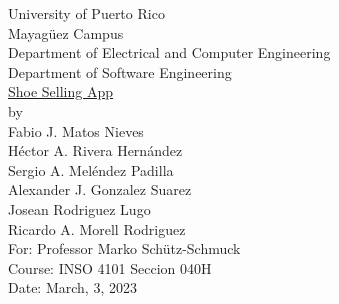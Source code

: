 \begin{titlepage}
  \begin{center}
    \large{University of Puerto Rico\\
    Mayagüez Campus\\
    \vspace{\baselineskip}
    Department of Electrical and Computer Engineering\\
    Department of Software Engineering\\}
    \vspace{5cm}
    \Huge{\underline{Shoe Selling App}\\}
    \vspace{3cm}
    \large by\\
    Fabio J. Matos Nieves\\
    Héctor A. Rivera Hernández\\
    Sergio A. Meléndez Padilla\\
    Alexander J. Gonzalez Suarez\\
    Josean Rodriguez Lugo\\
    Ricardo A. Morell Rodriguez\\
    \vspace{\baselineskip}
    For: Professor Marko Schütz-Schmuck\\
    Course: INSO 4101 Seccion 040H\\
    Date: March, 3, 2023\\
    \normalsize

  \end{center}
\end{titlepage}
